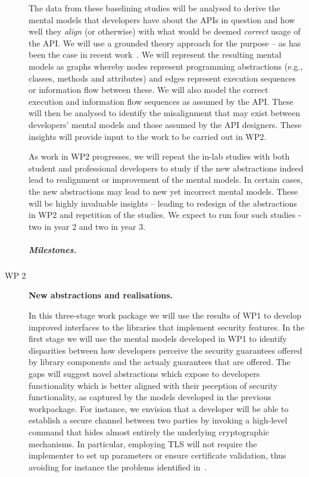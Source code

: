 \documentclass[10pt]{article}
\begin{document}
\begin{description}
The data from these baselining studies will be analysed to derive the mental models that developers have about the APIs in question and how well they \emph{align} (or otherwise) with what would be deemed \emph{correct} usage of the API. We will use a grounded theory approach for the purpose -- as has been the case in recent work~\cite{ramokapane2017}. We will represent the resulting mental models as graphs whereby nodes represent programming abstractions (e.g., classes, methods and attributes) and edges represent execution sequences or information flow between these. We will also model the correct execution and information flow sequences as assumed by the API. These will then be analysed to identify the misalignment that may exist between developers' mental models and those assumed by the API designers. These insights will provide input to the work to be carried out in WP2.

As work in WP2 progresses, we will repeat the in-lab studies with both student and professional developers to study if the new abstractions indeed lead to realignment or improvement of the mental models. In certain cases, the new abstractions may lead to new yet incorrect mental models. These will be highly invaluable insights -- leading to redesign of the abstractions in WP2 and repetition of the studies. We expect to run four such studies - two in year 2 and two in year 3.

\subparagraph{Milestones.} 


\item[WP 2] \textbf{New abstractions and realisations.} 

In this three-stage work package we will use the results of WP1 to develop improved interfaces to the libraries that implement security features.  
In the first stage we will use the mental models developed in WP1 to identify disparities between how developers perceive the security guarantees offered by library components and the actualy guarantees that are offered. The gaps will suggest novel abstractions which expose to developers functionality which is better aligned with their peception of security functionality, as captured by the models developed in the previous workpackage. 
For instance, we envision that a developer will be able to establish a secure channel between two parties by invoking a high-level command that hides almost entirely the underlying cryptographic mechanisms.   In particular, employing TLS will not require the implementer to set up parameters or ensure certificate validation, thus avoiding for instance the problems identified in~\cite{GIJABS12}. 


\end{description}
\end{document}
